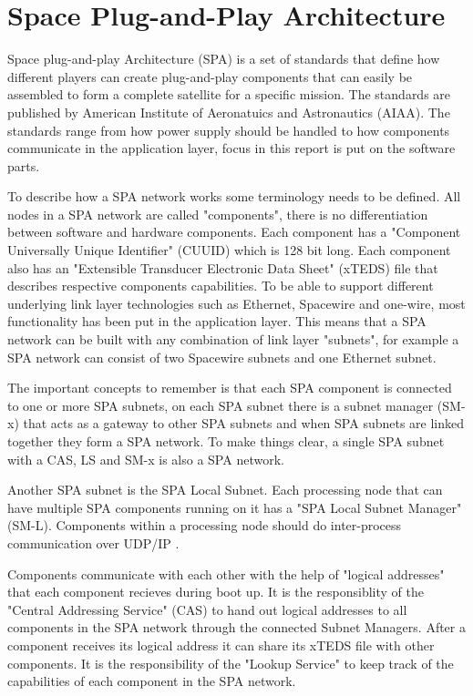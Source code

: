 \chapter{Space Plug-and-Play Architecture}\label{ch:spa}
Space plug-and-play Architecture (SPA) is a set of standards that define how
different players can create plug-and-play components that can easily be
assembled to form a complete satellite for a specific mission. The standards
are published by American Institute of Aeronatuics and Astronautics (AIAA). The
standards range from how power supply should be handled to how components
communicate in the application layer, focus in this report is put on the
software parts.

To describe how a SPA network works some terminology needs to be defined. All
nodes in a SPA network are called "components", there is no differentiation
between software and hardware components. Each component has a "Component
Universally Unique Identifier" (CUUID) which is 128 bit long. Each component
also has an "Extensible Transducer Electronic Data Sheet" (xTEDS) file that
describes respective components capabilities. To be able to support different
underlying link layer technologies such as Ethernet, Spacewire and one-wire,
most functionality has been put in the application layer. This means that a SPA
network can be built with any combination of link layer "subnets", for example
a SPA network can consist of two Spacewire subnets and one Ethernet subnet.


The important concepts to remember is that each SPA component is
connected to one or more SPA subnets, on each SPA subnet there is a subnet
manager (SM-x) that acts as a gateway to other SPA subnets and when SPA subnets
are linked together they form a SPA network. To make things clear, a single SPA
subnet with a CAS, LS and SM-x is also a SPA network.

Another SPA subnet is the SPA Local Subnet. Each processing node that can
have multiple SPA components running on it has a "SPA Local Subnet Manager"
(SM-L).  Components within a processing node should do inter-process
communication over UDP/IP \cite{spa:local-subnet}.

Components communicate with each other with the help of "logical addresses"
that each component recieves during boot up. It is the responsiblity of the
"Central Addressing Service" (CAS) to hand out logical addresses to all
components in the SPA network through the connected Subnet Managers. After a
component receives its logical address it can share its xTEDS file with other
components. It is the responsibility of the "Lookup Service" to keep track of
the capabilities of each component in the SPA network.

